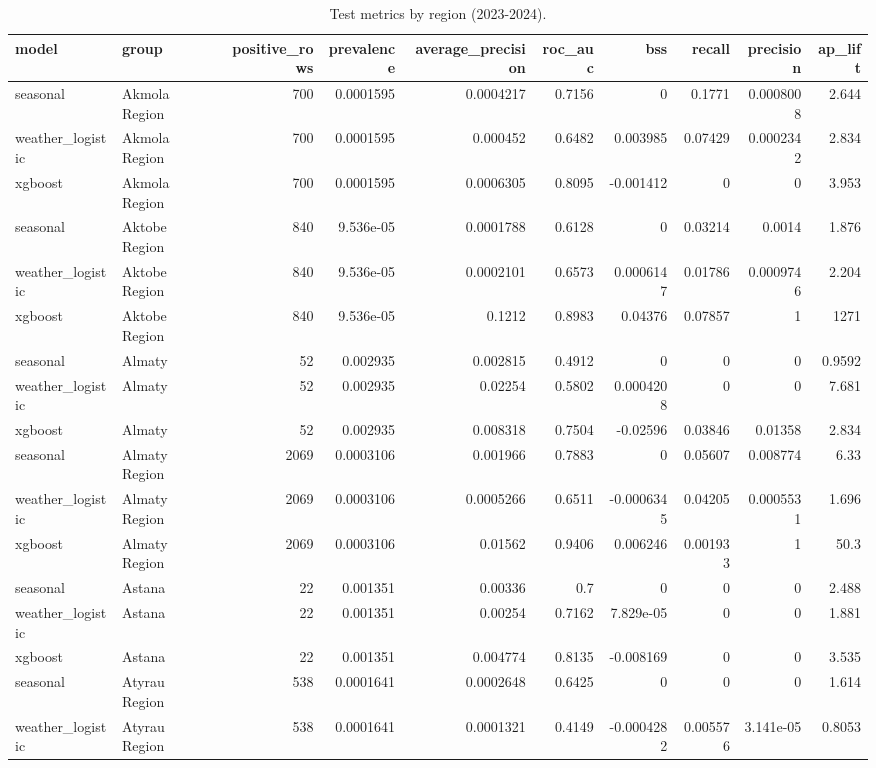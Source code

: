 \begin{table}
\caption{Test metrics by region (2023-2024).}
\label{tab:T8_region}
\begin{tabular}{llrrrrrrrr}
\toprule
model & group & positive_rows & prevalence & average_precision & roc_auc & bss & recall & precision & ap_lift \\
\midrule
seasonal & Akmola Region & 700 & 0.0001595 & 0.0004217 & 0.7156 & 0 & 0.1771 & 0.0008008 & 2.644 \\
weather_logistic & Akmola Region & 700 & 0.0001595 & 0.000452 & 0.6482 & 0.003985 & 0.07429 & 0.0002342 & 2.834 \\
xgboost & Akmola Region & 700 & 0.0001595 & 0.0006305 & 0.8095 & -0.001412 & 0 & 0 & 3.953 \\
seasonal & Aktobe Region & 840 & 9.536e-05 & 0.0001788 & 0.6128 & 0 & 0.03214 & 0.0014 & 1.876 \\
weather_logistic & Aktobe Region & 840 & 9.536e-05 & 0.0002101 & 0.6573 & 0.0006147 & 0.01786 & 0.0009746 & 2.204 \\
xgboost & Aktobe Region & 840 & 9.536e-05 & 0.1212 & 0.8983 & 0.04376 & 0.07857 & 1 & 1271 \\
seasonal & Almaty & 52 & 0.002935 & 0.002815 & 0.4912 & 0 & 0 & 0 & 0.9592 \\
weather_logistic & Almaty & 52 & 0.002935 & 0.02254 & 0.5802 & 0.0004208 & 0 & 0 & 7.681 \\
xgboost & Almaty & 52 & 0.002935 & 0.008318 & 0.7504 & -0.02596 & 0.03846 & 0.01358 & 2.834 \\
seasonal & Almaty Region & 2069 & 0.0003106 & 0.001966 & 0.7883 & 0 & 0.05607 & 0.008774 & 6.33 \\
weather_logistic & Almaty Region & 2069 & 0.0003106 & 0.0005266 & 0.6511 & -0.0006345 & 0.04205 & 0.0005531 & 1.696 \\
xgboost & Almaty Region & 2069 & 0.0003106 & 0.01562 & 0.9406 & 0.006246 & 0.001933 & 1 & 50.3 \\
seasonal & Astana & 22 & 0.001351 & 0.00336 & 0.7 & 0 & 0 & 0 & 2.488 \\
weather_logistic & Astana & 22 & 0.001351 & 0.00254 & 0.7162 & 7.829e-05 & 0 & 0 & 1.881 \\
xgboost & Astana & 22 & 0.001351 & 0.004774 & 0.8135 & -0.008169 & 0 & 0 & 3.535 \\
seasonal & Atyrau Region & 538 & 0.0001641 & 0.0002648 & 0.6425 & 0 & 0 & 0 & 1.614 \\
weather_logistic & Atyrau Region & 538 & 0.0001641 & 0.0001321 & 0.4149 & -0.0004282 & 0.005576 & 3.141e-05 & 0.8053 \\

\end{tabular}
\end{table}

